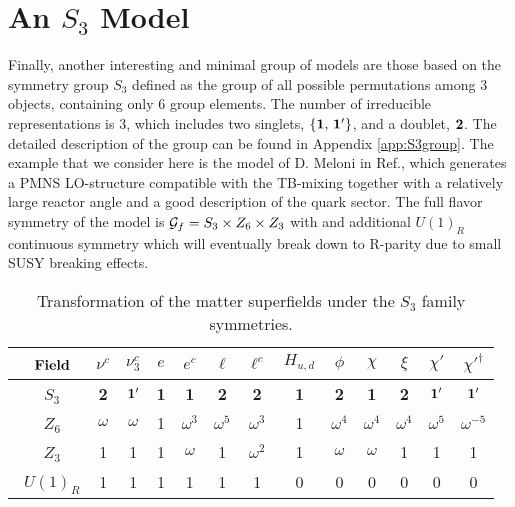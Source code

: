 \documentclass[a4paper,11pt]{article}
\begin{document}

\section{An $S_3$ Model}  \label{s3model}

Finally, another interesting and minimal group of models are those based on the symmetry group $S_3$ \cite{Haba:2005ds, Morisi:2005fy, Chen:2004rr, Xing:2010iu, Grimus:2005mu, Mohapatra:2006pu, Feruglio:2007hi, Ma:1991eg} defined as the group of all possible permutations among $3$ objects, containing only $6$ group elements. The number of irreducible representations is $3$, which includes two singlets, $\lbrace{\rm \bf 1},\, {\rm \bf 1'}\rbrace$, and a doublet, $\rm \bf 2$. The detailed description of the group can be found in Appendix \ref{app:S3group}. 
The example that we consider here is the model of D. Meloni in Ref.\cite{Meloni:2012ci}, which generates a PMNS LO-structure compatible with the TB-mixing together with a relatively large reactor angle and a good description of the quark sector. The full flavor symmetry of the model is ${\cal G}_f=S_3\times Z_6\times Z_3$ with and additional $U(1)_R$ continuous symmetry which will eventually break down to R-parity due to small SUSY breaking effects. 
\begin{table}[h!]
\centering 
\begin{tabular}{|c||c|c|c|c|c|c||c||c|c|c|c|c|}
\hline
~${\bf Field}$ & $\nu^c$ & $\nu^c_3$ & $e$ & $e^c$ & $\ell$ & $\ell^c$ & $H_{u,d}$ & $\phi$ & $\chi$ & $\xi$ & $\chi'$ & $\chi'^{\dagger}$  \\ 
\hline
\hline
~$S_3$  & \bf 2 &${\bf 1'}$ &\bf 1 &\bf 1 &\bf 2 &\bf 2 &\bf 1 &\bf 2 &\bf 1  &\bf 2 &${\bf 1'}$  &${\bf 1'}$ \\
~$Z_6$     &   $\omega$ &    $\omega$ &     1 & $\omega^3$ & $\omega^5$ & $\omega^3$ &     1 & $\omega^4$ &$\omega^4$ & $\omega^4$ &$\omega^5$ &$\omega^{-5}$  \\
~$Z_3$     &          1 &           1 &     1 &   $\omega$ &          1 & $\omega^2$ &     1 &   $\omega$ &      
 $\omega$  &          1 &           1&           1  \\
~$U(1)_R$  &          1 &           1 &     1 &          1 &          1 &          1 &     0 &          0 &     
        0  &          0 &           0&           0 \\
\hline
\end{tabular}
\caption{Transformation of the matter superfields under the $S_3$ family symmetries.}
\label{tab:S3pc}
\end{table}
\end{document}
